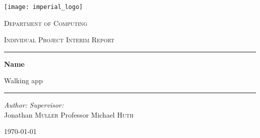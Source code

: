 \begin{titlepage}
    \begin{center}
        \vspace*{2cm}
        \texttt{[image: imperial\_logo]}
        \vspace{2cm}
        
        \LARGE
        \textsc{Department of Computing}
        
        \textsc{Individual Project Interim Report}
        
        \vspace{2cm}
        \hrule
        \vspace{0.5cm}
        
        \huge
        \textbf{Name}
        
        \vspace{0.2cm}
        
        \LARGE
        Walking app
        
        \vspace{0.5cm}
        \hrule
        \vspace{2cm}
        
        \begin{flushleft}
            \Large
            \textit{Author:}
            \hfill
            \textit{Supervisor:}\\
            Jonathan \textsc{Muller}
            \hfill
            Professor Michael \textsc{Huth}\\
        \end{flushleft}
        
        \vfill
        \Large
        \today
    \end{center}
\end{titlepage}